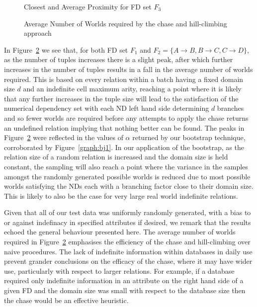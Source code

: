\begin{figure}
\centerline{}
\caption{\label{graph:4.2} {Closest and Average Proximity for FD set $F_3$  }}
\end{figure}

\begin{figure}
\centerline{}
\caption{\label{graph:4.3} {Average Number of Worlds required by
the chase and hill-climbing approach}}
\end{figure}

In Figure~\ref{graph:4.3} we see that, for both FD set $F_1$ and 
$F_2 = \{ A \to B, B \to C, C \to D \}$, as the number of tuples
increases there is a slight peak, after which further increases in the number
of tuples results in a fall in the average number of worlds required.
This is based on every relation within a batch having a fixed domain
size $d$ and an indefinite cell maximum arity, reaching a point where it is
likely that any further increases in the tuple size will lead to the
satisfaction of the numerical dependency set with each ND left hand
side determining $d$ branches and so fewer worlds are required before any 
attempts to apply the chase returns an undefined relation implying that
nothing better can be found. The peaks in Figure~\ref{graph:4.3} were
reflected in the values 
of $\alpha$ returned by our bootstrap technique, corroborated by
Figure~\ref{graph:bj1}. In our
application of the bootstrap, as the relation size of a random relation 
is increased and the domain size is held constant, the sampling will also
reach a point where the variance in the samples amongst the randomly
generated possible worlds is reduced due to most possible worlds 
satisfying the NDs each with a branching factor close to their domain
size. This is likely to also be the case for very large real world
indefinite relations.

\medskip

Given that all of our test data was uniformly randomly generated, with
a bias to or against indefinacy in specified attributes if desired, we
remark that the results echoed the general behaviour
presented here. The average number of worlds required in
Figure~\ref{graph:4.3} emphasises the efficiency of the chase and
hill-climbing over naive procedures.
The lack of indefinite information within databases in daily use prevent
grander conclusions on the efficacy of the chase, where it may have
wider use, particularly with respect to larger relations. For
example, if a database required only indefinite 
information in an attribute on the right hand side of a given FD and
the domain size was small with respect to the database size then the
chase would be an effective heuristic.

